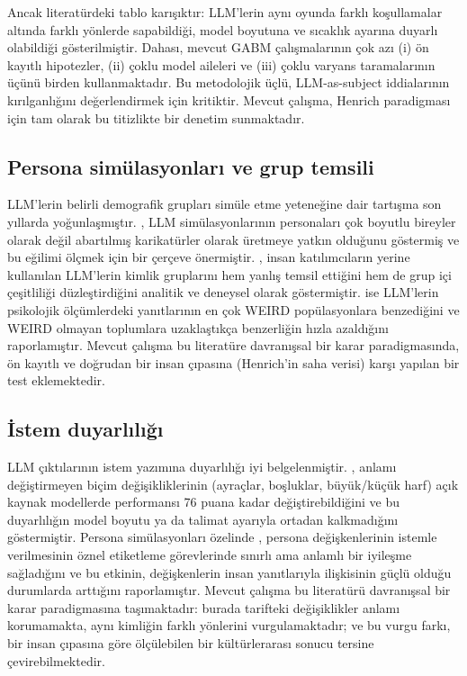 \documentclass[11pt]{article}
\begin{document}
Ancak literatürdeki tablo karışıktır: LLM'lerin aynı oyunda farklı koşullamalar altında farklı yönlerde sapabildiği, model boyutuna ve sıcaklık ayarına duyarlı olabildiği gösterilmiştir. Dahası, mevcut GABM çalışmalarının çok azı (i) ön kayıtlı hipotezler, (ii) çoklu model aileleri ve (iii) çoklu varyans taramalarının üçünü birden kullanmaktadır. Bu metodolojik üçlü, LLM-as-subject iddialarının kırılganlığını değerlendirmek için kritiktir. Mevcut çalışma, Henrich paradigması için tam olarak bu titizlikte bir denetim sunmaktadır.


\subsection{Persona simülasyonları ve grup temsili}

LLM'lerin belirli demografik grupları simüle etme yeteneğine dair tartışma son yıllarda yoğunlaşmıştır. \citet{cheng2023compost}, LLM simülasyonlarının personaları çok boyutlu bireyler olarak değil abartılmış karikatürler olarak üretmeye yatkın olduğunu göstermiş ve bu eğilimi ölçmek için bir çerçeve önermiştir. \citet{wang2025misportray}, insan katılımcıların yerine kullanılan LLM'lerin kimlik gruplarını hem yanlış temsil ettiğini hem de grup içi çeşitliliği düzleştirdiğini analitik ve deneysel olarak göstermiştir. \citet{atari2023which} ise LLM'lerin psikolojik ölçümlerdeki yanıtlarının en çok WEIRD popülasyonlara benzediğini ve WEIRD olmayan toplumlara uzaklaştıkça benzerliğin hızla azaldığını raporlamıştır. Mevcut çalışma bu literatüre davranışsal bir karar paradigmasında, ön kayıtlı ve doğrudan bir insan çıpasına (Henrich'in saha verisi) karşı yapılan bir test eklemektedir.


\subsection{İstem duyarlılığı}

LLM çıktılarının istem yazımına duyarlılığı iyi belgelenmiştir. \citet{sclar2024quantifying}, anlamı değiştirmeyen biçim değişikliklerinin (ayraçlar, boşluklar, büyük/küçük harf) açık kaynak modellerde performansı 76 puana kadar değiştirebildiğini ve bu duyarlılığın model boyutu ya da talimat ayarıyla ortadan kalkmadığını göstermiştir. Persona simülasyonları özelinde \citet{hu2024persona}, persona değişkenlerinin istemle verilmesinin öznel etiketleme görevlerinde sınırlı ama anlamlı bir iyileşme sağladığını ve bu etkinin, değişkenlerin insan yanıtlarıyla ilişkisinin güçlü olduğu durumlarda arttığını raporlamıştır. Mevcut çalışma bu literatürü davranışsal bir karar paradigmasına taşımaktadır: burada tarifteki değişiklikler anlamı korumamakta, aynı kimliğin farklı yönlerini vurgulamaktadır; ve bu vurgu farkı, bir insan çıpasına göre ölçülebilen bir kültürlerarası sonucu tersine çevirebilmektedir.
\end{document}
